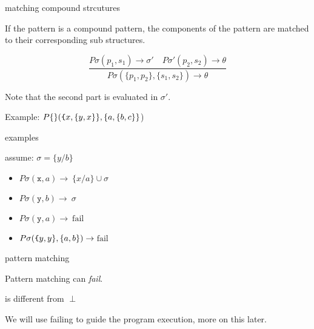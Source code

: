 \begin{frame}{matching compound strcutures}

If the pattern is a compound pattern, \pause the components of the pattern are matched to their corresponding sub structures.

\pause\vspace{10pt}

$$\frac{P\sigma(p_1, s_1) \rightarrow \sigma'  \quad  P\sigma'(p_2, s_2) \rightarrow \theta}{P\sigma(\lbrace p_1, p_2 \rbrace  , \lbrace s_1, s_2 \rbrace) \rightarrow \theta}$$


\pause \vspace{10pt}
Note that the second part is evaluated in $\sigma'$. 

\pause \vspace{10pt}Example: $P\{\}({\texttt \{x,\{y,x\}\}}, \{a, \{b,c\}\}$)

\vspace{20pt}{\em Match a compund pattern with anyting but a compound structure will fail.}

\end{frame}

\begin{frame}{examples}

assume: $\sigma = \lbrace y/b\rbrace$

\begin{itemize}
  \pause\item $P\sigma({\texttt x} , a) \rightarrow $\pause $\ \lbrace x/a \rbrace  \cup \sigma$
  \pause\item $P\sigma({\texttt y} , b) \rightarrow $\pause $\ \sigma$
  \pause\item $P\sigma({\texttt y} , a) \rightarrow $\pause  $\ \mathrm{fail}$
  \pause\item $P\sigma({\texttt \{ y, y\}} , \lbrace a, b \rbrace) \rightarrow $\pause $\ \mathrm{fail}$
\end{itemize}

\end{frame}

\begin{frame}{pattern matching}

\pause Pattern matching can {\em fail}. 

\pause\vspace{20pt}{\em fail} is different from $\perp$

We will use failing to guide the program execution, more on this later.

\end{frame}

